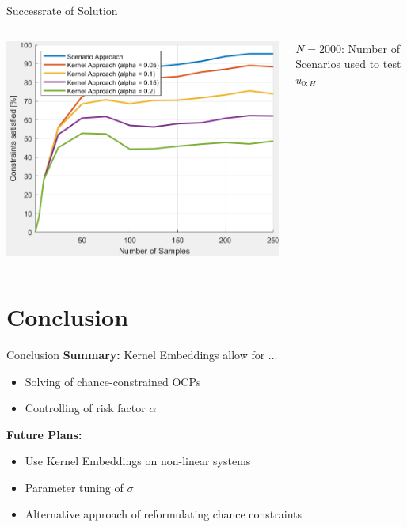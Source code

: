 \documentclass[student, noshadow, itr, english, aspectratio=169]{ITR_LSR_slides}
\begin{document}
\begin{frame}{Successrate of Solution}
	\vspace{.2cm}
	\begin{columns}[onlytextwidth, T]
		\begin{column}{.5\textwidth}
			\includegraphics[width=.9\textwidth]{robustness_plot}
		\end{column}
		\begin{column}{.5\textwidth}
			\vspace{.4cm}$N = 2000$: Number of Scenarios used to test $u_{0:H}$

			\vspace{1cm}
		\end{column}
	\end{columns}\vspace{.5cm}
\end{frame}	

\section{Conclusion}

\begin{frame}{Conclusion}
	\textbf{Summary:}
	Kernel Embeddings allow for ...
	\begin{itemize}
		\item Solving of chance-constrained OCPs
		\item Controlling of risk factor $\alpha$
	\end{itemize}
	\vspace{.5cm}
	
	\textbf{Future Plans:}
	\begin{itemize}
		\item Use Kernel Embeddings on non-linear systems
		\item Parameter tuning of $\sigma$
		\item Alternative approach of reformulating chance constraints
	\end{itemize}
\end{frame}
\end{document}
